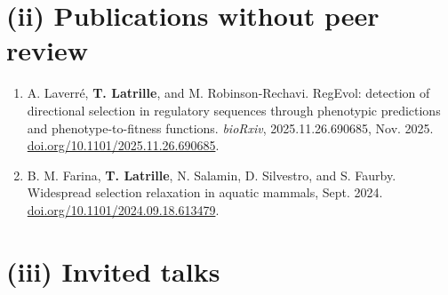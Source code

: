 \documentclass[11pt,a4paper]{moderncv}
\begin{document}
\section*{(ii) Publications without peer review}
\begin{enumerate}
\setlength\itemsep{1em}
    \item A. Laverré, \textbf{T. Latrille}, and M. Robinson-Rechavi. RegEvol: detection of directional selection in regulatory sequences through phenotypic predictions and phenotype-to-fitness functions. \textit{bioRxiv}, 2025.11.26.690685, Nov. 2025. \href{https://doi.org/10.1101/2025.11.26.690685}{doi.org/10.1101/2025.11.26.690685}.
    \item B. M. Farina, \textbf{T. Latrille}, N. Salamin, D. Silvestro, and S. Faurby. Widespread selection relaxation in aquatic mammals, Sept. 2024. \href{https://doi.org/10.1101/2024.09.18.613479}{doi.org/10.1101/2024.09.18.613479}.
\end{enumerate}

\section*{(iii) Invited talks}
\end{document}
